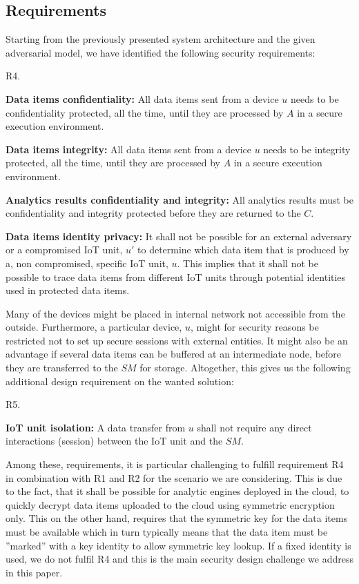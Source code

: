 {\subsection{Requirements}
\label{requirements:requirements}
Starting from the previously presented system architecture and the given adversarial model, we have identified the following security requirements:
\begin{labeling}{R4.}
\item [R1.] \textbf{Data items confidentiality:} All data items sent from a device $u$ needs to be confidentiality protected, all the time, until they are processed by $A$ in a secure execution environment.
\item[R2.] \textbf{Data items integrity:} All data items sent from a device $u$ needs to be integrity protected, all the time, until they are processed by $A$ in a secure execution environment.
\item[R3.] \textbf{Analytics results confidentiality and integrity:} All analytics results must be confidentiality and integrity protected before they are returned to the $C$. 
\item[R4.] \textbf{Data items identity privacy:} It shall not be possible for an external adversary or a compromised IoT unit, $u'$ to determine which data item that is produced by a, non compromised, specific IoT unit, $u$. This implies that it shall not be possible to trace data items from different IoT units through potential identities used in protected data items.
\end{labeling}
Many of the devices might be placed in internal network not accessible from the outside. Furthermore, a particular device, $u$, might for security reasons be restricted not to set up secure sessions with external entities. It might also be an advantage if several data items can be buffered at an intermediate node, before they are transferred to the $SM$ for storage. Altogether, this gives us the following additional design requirement on the wanted solution:

\begin{labeling}{R5.}
\item [R5.] \textbf{IoT unit isolation:} A data transfer from $u$ shall not require any direct interactions (session) between the IoT unit and the $SM$.
\end{labeling}
Among these, requirements, it is particular challenging to fulfill requirement R4 in combination with R1 and R2 for the scenario we are considering. This is due to the fact, that it shall be possible for analytic engines deployed in the cloud, to quickly decrypt data items uploaded to the cloud using symmetric encryption only. This on the other hand, requires that the symmetric key for the data items must be available which in turn typically means that the data item must be ''marked'' with a key identity to allow symmetric key lookup. If a fixed identity is used, we do not fulfil R4 and this is the main security design challenge we address in this paper.

}
